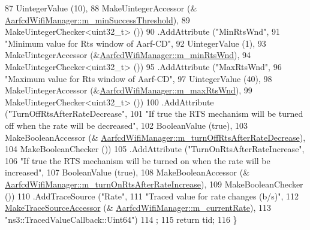 \begin{DoxyCode}
87                    UintegerValue (10),
88                    MakeUintegerAccessor (&
      \hyperlink{classns3_1_1AarfcdWifiManager_a5a7025c7463f7b1d003f9c3868018b8d}{AarfcdWifiManager::m\_minSuccessThreshold}),
89                    MakeUintegerChecker<uint32\_t> ())
90     .AddAttribute (\textcolor{stringliteral}{"MinRtsWnd"},
91                    \textcolor{stringliteral}{"Minimum value for Rts window of Aarf-CD"},
92                    UintegerValue (1),
93                    MakeUintegerAccessor (&\hyperlink{classns3_1_1AarfcdWifiManager_a5bd5aba48bf7267222ac3592a96a642a}{AarfcdWifiManager::m\_minRtsWnd}),
94                    MakeUintegerChecker<uint32\_t> ())
95     .AddAttribute (\textcolor{stringliteral}{"MaxRtsWnd"},
96                    \textcolor{stringliteral}{"Maximum value for Rts window of Aarf-CD"},
97                    UintegerValue (40),
98                    MakeUintegerAccessor (&\hyperlink{classns3_1_1AarfcdWifiManager_a6979a9d7c70e9bb5f4e00655072c505d}{AarfcdWifiManager::m\_maxRtsWnd}),
99                    MakeUintegerChecker<uint32\_t> ())
100     .AddAttribute (\textcolor{stringliteral}{"TurnOffRtsAfterRateDecrease"},
101                    \textcolor{stringliteral}{"If true the RTS mechanism will be turned off when the rate will be decreased"},
102                    BooleanValue (\textcolor{keyword}{true}),
103                    MakeBooleanAccessor (&
      \hyperlink{classns3_1_1AarfcdWifiManager_a5ebefecf767771e0d858de09fdb5c264}{AarfcdWifiManager::m\_turnOffRtsAfterRateDecrease}),
104                    MakeBooleanChecker ())
105     .AddAttribute (\textcolor{stringliteral}{"TurnOnRtsAfterRateIncrease"},
106                    \textcolor{stringliteral}{"If true the RTS mechanism will be turned on when the rate will be increased"},
107                    BooleanValue (\textcolor{keyword}{true}),
108                    MakeBooleanAccessor (&
      \hyperlink{classns3_1_1AarfcdWifiManager_a0938e5a61b20c3a78db3667d1e06f2fe}{AarfcdWifiManager::m\_turnOnRtsAfterRateIncrease}),
109                    MakeBooleanChecker ())
110     .AddTraceSource (\textcolor{stringliteral}{"Rate"},
111                      \textcolor{stringliteral}{"Traced value for rate changes (b/s)"},
112                      \hyperlink{group__tracing_gab21a770b9855af4e8f69f7531ea4a6b0}{MakeTraceSourceAccessor} (&
      \hyperlink{classns3_1_1AarfcdWifiManager_a1f86797dfc4dace6a388385913cbd6f4}{AarfcdWifiManager::m\_currentRate}),
113                      \textcolor{stringliteral}{"ns3::TracedValueCallback::Uint64"})
114   ;
115   \textcolor{keywordflow}{return} tid;
116 \}
\end{DoxyCode}



